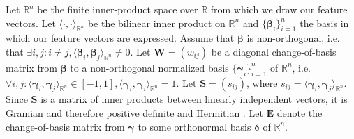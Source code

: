\documentclass[
  digital, %
  notable, %
  lof,     %
  lot,     %
  nopalatino, color
]{fithesis3}
\begin{document}
Let $\mathbb R^n$ be the finite inner-product space over
$\mathbb R$ from which we draw our feature vectors. Let
$\langle\cdot,\cdot\rangle_{\mathbb R^n}$ be the bilinear inner product on
$\mathbb R^n$ and $\{\bm{\beta}_i\}_{i = 1}^n$
the basis in which our feature vectors are expressed. Assume that
$\bm{\beta}$ is non-orthogonal, i.e. that $\exists i,
j: i\not=j, \langle \bm{\beta}_i,
\bm{\beta}_j\rangle_{\mathbb R^n} \not= 0$. Let $\mathbf W=(w_{ij})$ be a diagonal change-of-basis matrix from $\bm\beta$ to a non-orthogonal
normalized basis $\{\bm{\gamma}_i\}_{i = 1}^n$ of
$\mathbb R^n$, i.e. $\forall i, j: \langle \bm{\gamma}_i,
\bm{\gamma}_j\rangle_{\mathbb R^n}\in[-1, 1], \langle \bm{\gamma}_i,
\bm{\gamma}_i\rangle_{\mathbb R^n}=1$.  Let $\mathbf S=(s_{ij})$, where $s_{ij} = \langle \bm{\gamma}_i, \bm{\gamma}_j\rangle_{\mathbb
R^n}$. Since $\mathbf S$ is a matrix of inner products between linearly
independent vectors, it is Gramian and therefore positive
definite and Hermitian%
. Let $\mathbf E$ denote the
change-of-basis matrix from $\bm\gamma$ to some orthonormal
basis $\bm\delta$ of $\mathbb R^n$.
\end{document}
